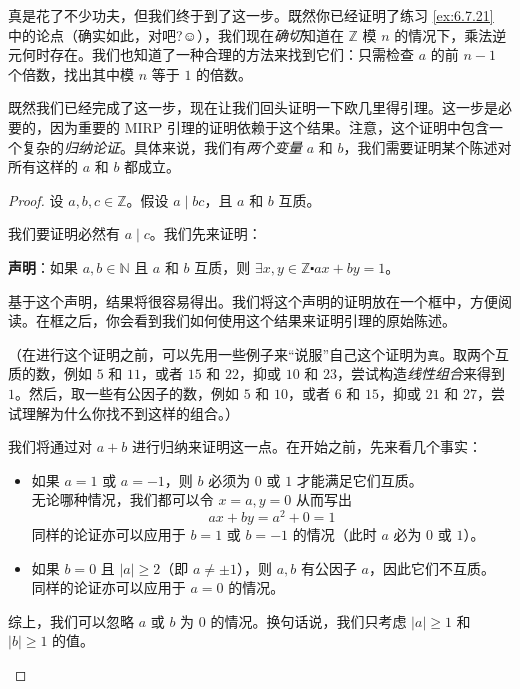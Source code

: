 真是花了不少功夫，但我们终于到了这一步。既然你已经证明了练习 \ref{ex:6.7.21} 中的论点（确实如此，对吧?$\smiley{}$），我们现在\emph{确切}知道在 $\mathbb{Z}$ 模 $n$ 的情况下，乘法逆元何时存在。我们也知道了一种合理的方法来找到它们：只需检查 $a$ 的前 $n-1$ 个倍数，找出其中模 $n$ 等于 $1$ 的倍数。

既然我们已经完成了这一步，现在让我们回头证明一下欧几里得引理。这一步是必要的，因为重要的 MIRP 引理的证明依赖于这个结果。注意，这个证明中包含一个复杂的\emph{归纳论证}。具体来说，我们有\emph{两个变量} $a$ 和 $b$，我们需要证明某个陈述对所有这样的 $a$ 和 $b$ 都成立。

\begin{proof}
    设 $a, b, c \in \mathbb{Z}$。假设 $a \mid bc$，且 $a$ 和 $b$ 互质。

    我们要证明必然有 $a \mid c$。我们先来证明：

    \textbf{声明}：如果 $a, b \in \mathbb{N}$ 且 $a$ 和 $b$ 互质，则 $\exists x, y \in \mathbb{Z} \centerdot ax+by = 1$。

    基于这个声明，结果将很容易得出。我们将这个声明的证明放在一个框中，方便阅读。在框之后，你会看到我们如何使用这个结果来证明引理的原始陈述。

    （在进行这个证明之前，可以先用一些例子来``说服''自己这个证明为\verb|真|。取两个互质的数，例如 $5$ 和 $11$，或者 $15$ 和 $22$，抑或 $10$ 和 $23$，尝试构造\emph{线性组合}来得到 $1$。然后，取一些有公因子的数，例如 $5$ 和 $10$，或者 $6$ 和 $15$，抑或 $21$ 和 $27$，尝试理解为什么你找不到这样的组合。）

    \begin{tcolorbox}[colback=gray!10,%
        colframe=black,%
        width=\textwidth,%
        arc=2mm, auto outer arc,
        title={证明声明},breakable,enhanced jigsaw,
        before upper={\parindent15pt\noindent},	]
            我们将通过对 $a+b$ 进行归纳来证明这一点。在开始之前，先来看几个事实：
            \begin{itemize}
                \item 如果 $a=1$ 或 $a=-1$，则 $b$ 必须为 $0$ 或 $1$ 才能满足它们互质。\\
                    无论哪种情况，我们都可以令 $x=a, y=0$ 从而写出
                    \[ax + by = a^2 + 0 = 1\]
                    同样的论证亦可以应用于 $b=1$ 或 $b=-1$ 的情况（此时 $a$ 必为 $0$ 或 $1$）。
                \item 如果 $b=0$ 且 $|a| \ge 2$（即 $a \ne \pm 1$），则 $a, b$ 有公因子 $a$，因此它们不互质。\\
                    同样的论证亦可以应用于 $a=0$ 的情况。
            \end{itemize}
            综上，我们可以忽略 $a$ 或 $b$ 为 $0$ 的情况。换句话说，我们只考虑 $|a| \ge 1$ 和 $|b| \ge 1$ 的值。\\


\end{tcolorbox}
\end{proof}
